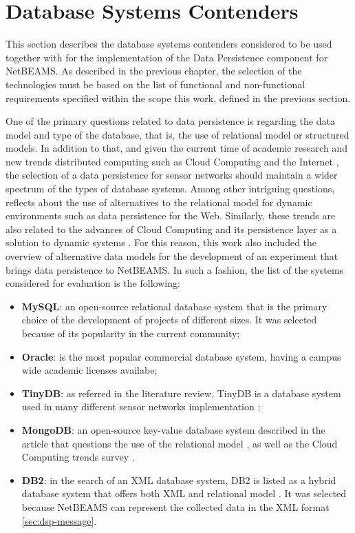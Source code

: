 \section{Database Systems Contenders}

This section describes the database systems contenders considered to be used
together with for the implementation of the Data Persistence component for
NetBEAMS. As described in the previous chapter, the selection of the
technologies must be based on the list of functional and non-functional
requirements specified within the scope this work, defined in the previous
section.

One of the primary questions related to data persistence is regarding the data
model and type of the database, that is, the use of relational model or
structured models. In addition to that, and given the current time of academic
research and new trends distributed computing such as Cloud Computing and the
Internet \cite{cloud-comp-survey}, the selection of a data persistence for
sensor networks should maintain a wider spectrum of the types of database
systems. Among other intriguing questions, \cite{db-is-rdbs-dommed} reflects
about the use of alternatives to the relational model for dynamic environments
such as data persistence for the Web. Similarly, these trends are also related
to the advances of Cloud Computing and its persistence layer as a solution to
dynamic systems \cite{cloud-comp-architectures}. For this reason, this work
also included the overview of alternative data models for the development of
an experiment that brings data persistence to NetBEAMS. In such a fashion, the
list of the systems considered for evaluation is the following:

\begin{itemize}
  \item \textbf{MySQL}\cite{mysql}: an open-source relational database system
  that is the primary choice of the development of projects of different sizes. It was selected
  because of its popularity in the current community;
  \item \textbf{Oracle}\cite{oracle}: is the most popular commercial database
  system, having a campus wide academic licenses availabe;
  \item \textbf{TinyDB}\cite{tinydb}: as referred in the literature review,
  TinyDB is a database system used in many different sensor networks implementation
  \cite{sn-db-tinydb};
  \item \textbf{MongoDB}\cite{mongodb}: an open-source key-value database system
  described in the article that questions the use of the relational model
  \cite{db-is-rdbs-dommed}, as well as the Cloud Computing trends survey
  \cite{cloud-comp-architectures}.
  \item \textbf{DB2}\cite{db2}: in the search of an XML database system, DB2 is
  listed as a hybrid database system that offers both XML and relational model
  \cite{db-xml-enabled}. It was selected because NetBEAMS can represent the
  collected data in the XML format \ref{sec:dsp-message}.
\end{itemize}

